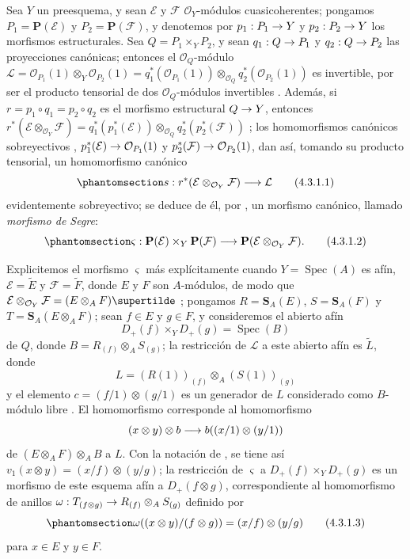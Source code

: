\documentclass[oneside,10pt]{amsart}
\makeatletter
\newcommand{\ega@arrow}[2]{\mathchoice{#1}{#2}{#2}{#2}}
\renewcommand{\to}{\ega@arrow{\longrightarrow}{\rightarrow}}
\newcommand{\oldpage}[2][]{\marginnote{\normalfont\footnotesize\textbf{#1}~|~#2}\ignorespaces}
\let\EGAOriginalLabel\label
\renewcommand{\label}[1]{\phantomsection\EGAOriginalLabel{#1}}
\makeatother
\begin{document}
\begin{env}[4.3.1]
\label{II.4.3.1-fr}
Sea $Y$ un preesquema, y sean $\mathcal{E}$ y $\mathcal{F}$ $\mathcal{O}_Y$-módulos cuasicoherentes;
pongamos $P_1=\mathbf{P}(\mathcal{E})$ y $P_2=\mathbf{P}(\mathcal{F})$, y denotemos por $p_1:P_1\to Y$ y $p_2:P_2\to Y$ los morfismos estructurales.
Sea $Q=P_1\times_YP_2$, y sean $q_1:Q\to P_1$ y $q_2:Q\to P_2$ las proyecciones canónicas;
entonces el $\mathcal{O}_Q$-módulo
$\mathcal{L}=\mathcal{O}_{P_1}(1)\otimes_Y\mathcal{O}_{P_2}(1)
=q_1^*(\mathcal{O}_{P_1}(1))\otimes_{\mathcal{O}_Q}
q_2^*(\mathcal{O}_{P_2}(1))$ es invertible, por ser el producto tensorial de dos $\mathcal{O}_Q$-módulos invertibles .
Además, si $r=p_1\circ q_1=p_2\circ q_2$ es el morfismo estructural $Q\to Y$, entonces
$r^*(\mathcal{E}\otimes_{\mathcal{O}_Y}\mathcal{F})
=q_1^*(p_1^*(\mathcal{E}))\otimes_{\mathcal{O}_Q}
q_2^*(p_2^*(\mathcal{F}))$ ;
los homomorfismos canónicos sobreyectivos , $p_1^*(\mathcal{E})\to\mathcal{O}_{P_1}(1)$ y $p_2^*(\mathcal{F})\to\mathcal{O}_{P_2}(1)$, dan así, tomando su producto tensorial, un homomorfismo canónico
\[
\label{II.4.3.1.1-fr}
  s:r^*(\mathcal{E}\otimes_{\mathcal{O}_Y}\mathcal{F})\longrightarrow
  \mathcal{L}
\tag{4.3.1.1}
\]
evidentemente sobreyectivo;
se deduce de él, por , un morfismo canónico, llamado \emph{morfismo de Segre}:
\[
\label{II.4.3.1.2-fr}
  \varsigma:\mathbf{P}(\mathcal{E})\times_Y\mathbf{P}(\mathcal{F})
  \longrightarrow
  \mathbf{P}(\mathcal{E}\otimes_{\mathcal{O}_Y}\mathcal{F}).
\tag{4.3.1.2}
\]

Explicitemos el morfismo $\varsigma$ más explícitamente cuando $Y=\operatorname{Spec}(A)$ es afín, $\mathcal{E}=\widetilde{E}$ y $\mathcal{F}=\widetilde{F}$, donde $E$ y $F$ son $A$-módulos, de modo que $\mathcal{E}\otimes_{\mathcal{O}_Y}\mathcal{F}=(E\otimes_A F)\supertilde$ ;
pongamos $R=\mathbf{S}_A(E)$, $S=\mathbf{S}_A(F)$ y $T=\mathbf{S}_A(E\otimes_A F)$;
sean $f\in E$ y $g\in F$, y consideremos el abierto afín
\[
  D_+(f)\times_YD_+(g)=\operatorname{Spec}(B)
\]
\oldpage[II]{77}
de $Q$, donde $B=R_{(f)}\otimes_AS_{(g)}$;
la restricción de $\mathcal{L}$ a este abierto afín es $\widetilde{L}$, donde
\[
  L=(R(1))_{(f)}\otimes_A(S(1))_{(g)}
\]
y el elemento $c=(f/1)\otimes(g/1)$ es un generador de $L$ considerado como $B$-módulo libre .
El homomorfismo  corresponde al homomorfismo
\[
  (x\otimes y)\otimes b\to b((x/1)\otimes(y/1))
\]
de $(E\otimes_A F)\otimes_AB$ a $L$.
Con la notación de , se tiene así $v_1(x\otimes y)=(x/f)\otimes(y/g)$;
la restricción de $\varsigma$ a $D_+(f)\times_YD_+(g)$ es un morfismo de este esquema afín a $D_+(f\otimes g)$, correspondiente al homomorfismo de anillos $\omega:T_{(f\otimes g)}\to R_{(f)}\otimes_AS_{(g)}$ definido por
\[
\label{II.4.3.1.3-fr}
  \omega((x\otimes y)/(f\otimes g))=(x/f)\otimes(y/g)
\tag{4.3.1.3}
\]
para $x\in E$ y $y\in F$.
\end{env}
\end{document}
